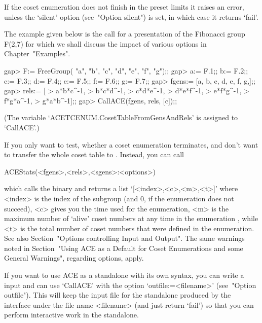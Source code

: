 If the coset enumeration does not  finish  in  the  preset  limits  it
raises an error, unless the `silent' option (see~"Option  silent")  is
set, in which case it returns `fail'.

The  example  given  below is  the  call  for  a presentation  of  the
Fibonacci  group F(2,7)  for  which  we shall  discuss  the impact  of
various options in Chapter~"Examples".

\begintt
gap> F:= FreeGroup( "a", "b", "c", "d", "e", "f", "g");;
gap> a:= F.1;; b:= F.2;; c:= F.3;; d:= F.4;; e:= F.5;; f:= F.6;; g:= F.7;;
gap> fgens:= [a, b, c, d, e, f, g,];;
gap> rels:= [
> a*b*c^-1,
> b*c*d^-1,
> c*d*e^-1,
> d*e*f^-1,
> e*f*g^-1,
> f*g*a^-1,
> g*a*b^-1];;
gap> CallACE(fgens, rels, [c]);;
\endtt

(The  variable  `ACETCENUM.CosetTableFromGensAndRels'  is assigned  to
`CallACE'.)

If you only want to  test, whether a coset enumeration terminates, and
don't want to  transfer the whole coset table  to {\GAP}. Instead, you
can call

\>ACEStats(<fgens>,<rels>,<sgens>:<options>)

which   calls   the    {\ACE}    binary    and    returns    a    list
`[<index>,<c>,<m>,<t>]' where <index> is the  index  of  the  subgroup
(and $0$, if the enumeration does not succeed), <c> gives you the time
used for the enumeration, <m> is the  maximum  number  of  \lq{}alive'
coset numbers at any time in the enumeration , while <t> is the  total
number of coset numbers that were defined in the enumeration. See also
Section~"Options controlling Input  and  Output".  The  same  warnings
noted in Section~"Using ACE as a Default for  Coset  Enumerations  and
some General Warnings", regarding options, apply.


If you want  to use ACE as  a standalone with its own  syntax, you can
write  a  {\GAP}   input  and  can  use  `CallACE'   with  the  option
`outfile:=<filename>' (see~"Option outfile"). This  will  keep  the
input file for the {\ACE} standalone produced by the {\GAP}  interface
under the file name <filename> (and just return `fail')  so  that  you
can perform interactive work in the standalone.



